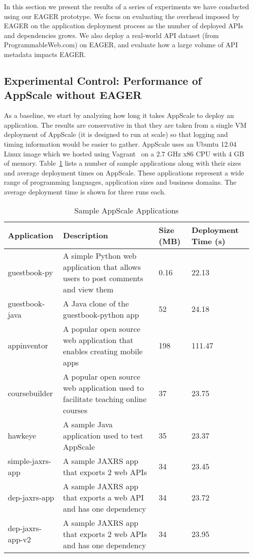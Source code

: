 In this section we present the results of a series of experiments we have conducted using our EAGER prototype. We focus
on evaluating the overhead imposed by EAGER on the application deployment process as the number of deployed APIs and dependencies
grows. We also deploy a real-world API dataset (from ProgrammableWeb.com) on EAGER, and evaluate how a large 
volume of API metadata impacts EAGER.

\subsection{Experimental Control: Performance of AppScale without EAGER}

As a baseline, we start by analyzing how long it takes AppScale to deploy an
application.  The results are conservative in that they are taken from a
single VM deployment of AppScale (it is designed to run at scale) so that
logging and timing information would be easier to gather.  AppScale uses an
Ubuntu 12.04 Linux image which we hosted using Vagrant~\cite{vagrant}    
on a $2.7$ GHz x86 CPU with $4$ GB of memory.
Table~\ref{tab:sample_apps} lists a number of sample
applications along with their sizes and average deployment times on AppScale.
These applications represent a wide range of programming languages,
application sizes and business domains. The average deployment time is shown
for three runs each.

\begin{table}[ht]
\begin{center}
\begin{tabular}{| p{1.5cm} | p{3cm} | p{0.5cm} | p{1.1cm} | }
\hline
Application & Description & Size (MB) & Deployment Time (s) \\ \hline
guestbook-py & A simple Python web application that allows users to post
comments and view them & 0.16 & 22.13 \\ \hline
guestbook-java & A Java clone of the guestbook-python app & 52 & 24.18 \\ \hline
appinventor & A popular open source web application that enables creating mobile apps & 198 & 111.47 \\ \hline
coursebuilder & A popular open source web application used to facilitate teaching online courses & 37 & 23.75 \\ \hline
hawkeye & A sample Java application used to test AppScale & 35 & 23.37 \\ \hline
simple-jaxrs-app & A sample JAXRS app that exports 2 web APIs & 34 & 23.45 \\ \hline
dep-jaxrs-app & A sample JAXRS app that exports a web API and has one dependency & 34 & 23.72 \\ \hline
dep-jaxrs-app-v2 & A sample JAXRS app that exports 2 web APIs and has one dependency & 34 & 23.95 \\ \hline
\end{tabular}
\end{center}
\caption{Sample AppScale Applications}
\label{tab:sample_apps}
\end{table}

